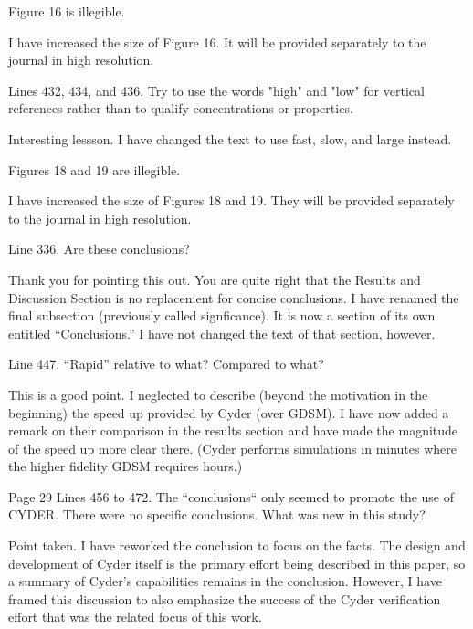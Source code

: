 \documentclass[answers,12pt]{exam}
\begin{document}
\begin{questions}
\question Figure 16 is illegible.
\begin{solution}
I have increased the size of Figure 16.
        It will be provided separately to the journal in high resolution. 
\end{solution}

 

\question Lines 432, 434, and 436. Try to use the words "high" and "low" for vertical references rather than to qualify concentrations or properties.
\begin{solution}
Interesting lessson. I have changed the text to use fast, slow, and large instead.
\end{solution}

 

\question Figures 18 and 19 are illegible.
\begin{solution}
I have increased the size of Figures 18 and 19.
        They will be provided separately to the journal in high resolution. 
\end{solution}

 

\question Line 336. Are these conclusions?
\begin{solution}
Thank you for pointing this out. You are quite right that the Results and 
        Discussion Section is no replacement for concise conclusions. I have 
        renamed the final subsection (previously called signficance). It is now 
        a section of its own entitled ``Conclusions.'' I have not changed the 
        text of that section, however. 
\end{solution}

 

\question Line 447. ``Rapid'' relative to what? Compared to what?
\begin{solution}
        This is a good point. I neglected to describe (beyond the motivation in 
        the beginning) the speed up provided by Cyder (over GDSM). I have now 
        added a remark on their comparison in the results section and have made 
        the magnitude of the speed up more clear there. (Cyder performs 
        simulations in minutes where the higher fidelity GDSM requires hours.) 
\end{solution}

 

\question Page 29 Lines 456 to 472. The ``conclusions`` only seemed to promote the use of CYDER. There were no specific conclusions. What was new in this study? 
\begin{solution}
Point taken. I have reworked the conclusion to focus on the facts. The 
        design and development of Cyder itself is the primary effort being 
        described in this paper, so a summary of Cyder's capabilities remains 
        in the conclusion. However, I have framed this discussion to also 
        emphasize the success of the Cyder verification effort that was the related 
        focus of this work.
\end{solution}



\end{questions}
\end{document}
